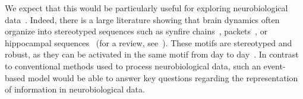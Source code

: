 \documentclass[runningheads]{llncs}
\newcommand{\kernel}{K} %
\begin{document}
We expect that this would be particularly useful for exploring neurobiological data~\cite{mackevicius_unsupervised_2019}. Indeed, there is a large literature showing that brain dynamics often organize into stereotyped sequences such as synfire chains~\cite{ikegaya_synfire_2004}, packets~\cite{luczak_sequential_2007}, or hippocampal sequences~\cite{villette_internally_2015} (for a review, see~\cite{grimaldi_precise_2023}). These motifs are stereotyped and robust, as they can be activated in the same motif from day to day~\cite{haimerl_internal_2019}. In contrast to conventional methods used to process neurobiological data, such an event-based model would be able to answer key questions regarding the representation of information in neurobiological data. %
%
% 
% 
\end{document}
